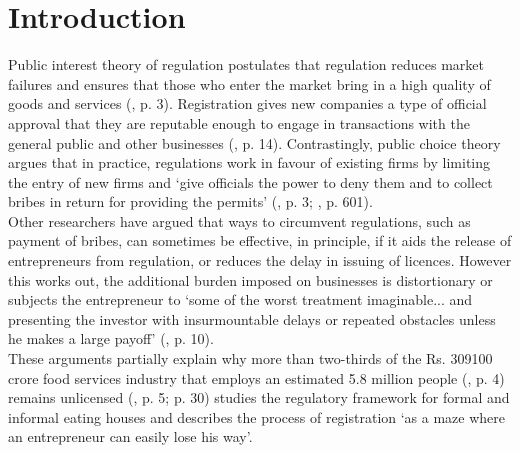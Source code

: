 \documentclass[a4paper, 12pt]{article}
\begin{document}
                    \newpage
                    \section{Introduction}
                    \label{intro}
                    Public interest theory of regulation postulates that regulation reduces market failures and ensures that those who enter the market bring in a high quality of goods and services (\cite{hertog2010}, p. 3). Registration gives new companies a type of official 
approval that they are reputable enough to engage in transactions with the general public and other businesses (\cite{sri1999}, p. 14). Contrastingly, public choice theory argues that in practice, regulations work in favour of existing firms by limiting the entry of new firms 
and ‘give officials the power to deny them and to collect bribes in return for providing the permits’ (\cite{stigler1971theory}, p. 3; \cite{shleifer1993corruption}, p. 601).\\ %
                    
                    Other researchers \parencite{bardhan1997corruption} have argued that ways to circumvent regulations, such as payment of bribes, can sometimes be effective, in principle, if it aids the release of entrepreneurs from regulation, or reduces the delay in issuing of 
licences. However this works out, the additional burden imposed on businesses is distortionary \parencite{djankov2002regulation} or subjects the entrepreneur to ‘some of the worst treatment imaginable... and presenting the investor with insurmountable delays or repeated 
obstacles unless he makes a large payoff’ (\cite{emery2000administrative}, p. 10). \\
                    
                    These arguments partially explain why more than two-thirds of the Rs. 309100 crore food services industry that employs an estimated 5.8 million people (\cite{kpmg2016foodservindustry}, p. 4) remains unlicensed (\cite{kpmg2016foodservindustry}, p. 5; \cite{kaushikpd2013formalinformal} p. 30) studies the 
regulatory framework for formal and informal eating houses and describes the process of registration ‘as a maze where an entrepreneur can easily lose his way’. \\
                    
\end{document}
